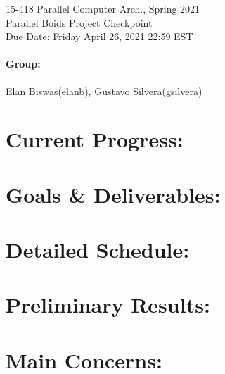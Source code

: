 \documentclass[12pt]{article}
\begin{document}
\begin{centering}
    {\large 15-418 Parallel Computer Arch., Spring 2021\\}
    \vspace{2ex}
    {\LARGE Parallel Boids Project Checkpoint\\}
    \vspace{2ex}
    {\large Due Date: Friday April 26, 2021 22:59 EST\\}
\end{centering}

\bigskip

\paragraph{Group:} Elan Biswas(elanb), Gustavo Silvera(gsilvera)

\section*{Current Progress:} 
\section*{Goals & Deliverables:} 
\section*{Detailed Schedule:} 
\section*{Preliminary Results:} 
\section*{Main Concerns:} 
\end{document}

